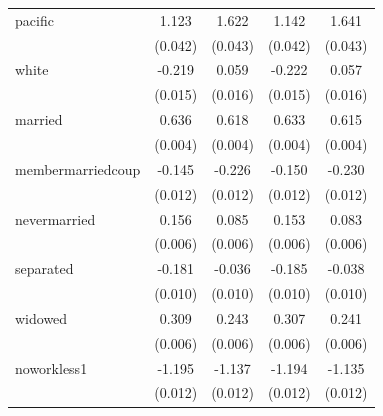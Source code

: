\documentclass[11pt,a4paper,oldfontcommands]{memoir}
\begin{document}
{\begin{footnotesize}
\begin{footnotesize}
\begin{longtable}{l*{4}{c}}
pacific             &       1.123\sym{***}&       1.622\sym{***}&       1.142\sym{***}&       1.641\sym{***}\\
                    &     (0.042)         &     (0.043)         &     (0.042)         &     (0.043)         \\
 
white               &      -0.219\sym{***}&       0.059\sym{***}&      -0.222\sym{***}&       0.057\sym{***}\\
                    &     (0.015)         &     (0.016)         &     (0.015)         &     (0.016)         \\
 
married             &       0.636\sym{***}&       0.618\sym{***}&       0.633\sym{***}&       0.615\sym{***}\\
                    &     (0.004)         &     (0.004)         &     (0.004)         &     (0.004)         \\
 
membermarriedcoup   &      -0.145\sym{***}&      -0.226\sym{***}&      -0.150\sym{***}&      -0.230\sym{***}\\
                    &     (0.012)         &     (0.012)         &     (0.012)         &     (0.012)         \\
 
nevermarried        &       0.156\sym{***}&       0.085\sym{***}&       0.153\sym{***}&       0.083\sym{***}\\
                    &     (0.006)         &     (0.006)         &     (0.006)         &     (0.006)         \\
 
separated           &      -0.181\sym{***}&      -0.036\sym{***}&      -0.185\sym{***}&      -0.038\sym{***}\\
                    &     (0.010)         &     (0.010)         &     (0.010)         &     (0.010)         \\
 
widowed             &       0.309\sym{***}&       0.243\sym{***}&       0.307\sym{***}&       0.241\sym{***}\\
                    &     (0.006)         &     (0.006)         &     (0.006)         &     (0.006)         \\
 
noworkless1         &      -1.195\sym{***}&      -1.137\sym{***}&      -1.194\sym{***}&      -1.135\sym{***}\\
                    &     (0.012)         &     (0.012)         &     (0.012)         &     (0.012)         \\
 

\end{longtable}
\end{footnotesize}
\end{footnotesize}}
\end{document}

